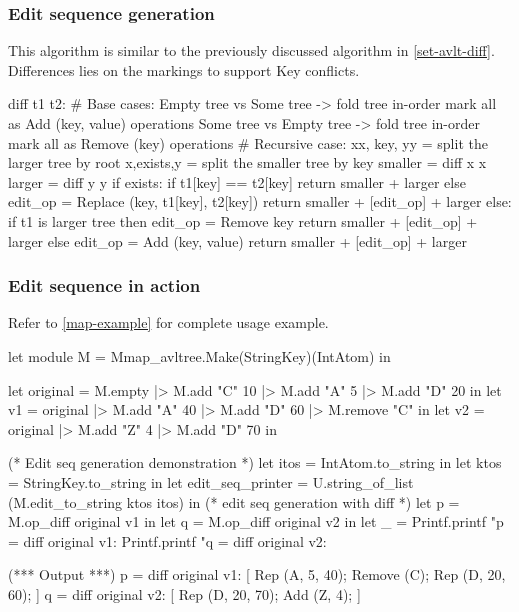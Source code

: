 \documentclass{article}
\begin{document}
\subsubsection{Edit sequence generation}
This algorithm is similar to the previously discussed algorithm in \ref{set-avlt-diff}. 
Differences lies on the markings to support Key conflicts.

\begin{longlisting}[python]
diff t1 t2:
  # Base cases:
     Empty tree vs Some tree -> 
     	fold tree in-order 
     	  mark all as Add (key, value) operations
     Some tree vs Empty tree ->
     	fold tree in-order 
     	  mark all as Remove (key) operations
  # Recursive case:
     xx, key, yy = split the larger tree by root
     x,exists,y = split the smaller tree by key
     smaller = diff x x
  	 larger = diff y y
     if exists:
     	if t1[key] == t2[key]
     		return smaller + larger
        else
        	edit_op = Replace (key, t1[key], t2[key])
            return smaller + [edit_op] + larger
     else:
     	if t1 is larger tree then 
        	edit_op = Remove key
            return smaller + [edit_op] + larger
        else 
        	edit_op = Add (key, value)
        	return smaller + [edit_op] + larger
\end{longlisting}

\subsubsection{Edit sequence in action}
Refer to \ref{map-example} for complete usage example.

\begin{longlisting}
let module M = Mmap_avltree.Make(StringKey)(IntAtom) in

let original = M.empty |> M.add "C" 10 |> M.add "A" 5 |> M.add "D" 20 in
let v1 = original |> M.add "A" 40 |> M.add "D" 60 |> M.remove "C" in
let v2 = original |> M.add "Z" 4 |> M.add "D" 70 in

(* Edit seq generation demonstration *)
let itos = IntAtom.to_string in
let ktos = StringKey.to_string in 
let edit_seq_printer = U.string_of_list (M.edit_to_string ktos itos) in
(* edit seq generation with diff *)
let p = M.op_diff original v1 in
let q = M.op_diff original v2 in
let _ = 
  Printf.printf "p = diff original v1: %
  Printf.printf "q = diff original v2: %

(*** Output ***)
p = diff original v1: [ Rep (A, 5, 40); Remove (C); Rep (D, 20, 60); ]
q = diff original v2: [ Rep (D, 20, 70); Add (Z, 4); ]
\end{longlisting}
\end{document}
